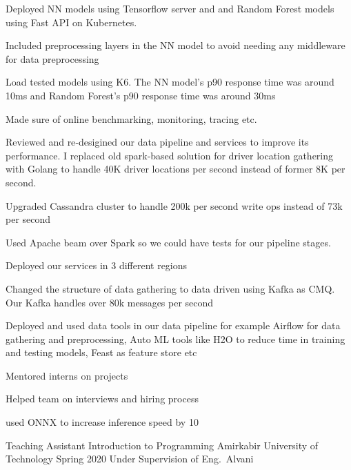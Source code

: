 \begin{cventries}
{\begin{cvitems}
        \item Deployed NN models using Tensorflow server and and Random Forest models using Fast API on Kubernetes. 
        \item Included preprocessing layers in the NN model to avoid needing any middleware for data preprocessing
        \item Load tested models using K6. The NN model's p90 response time was around 10ms and Random Forest's p90 response time was around 30ms
        \item Made sure of online benchmarking, monitoring, tracing etc.
        \item Reviewed and re‐desigined our data pipeline and services to improve its performance. I replaced old spark‐based solution for driver location gathering with Golang to handle 40K driver locations per second instead of former 8K per second.
        \item Upgraded Cassandra cluster to handle 200k per second write ops instead of 73k per second
        \item Used Apache beam over Spark so we could have tests for our pipeline stages.
        \item Deployed our services in 3 different regions 
        \item Changed the structure of data gathering to data driven using Kafka as CMQ. Our Kafka handles over 80k messages per second
        \item Deployed and used data tools in our data pipeline for example Airflow for data gathering and preprocessing, Auto ML tools like H2O to reduce time in training and testing models, Feast as feature store etc
        \item Mentored interns on projects
        \item Helped team on interviews and hiring process
        \item used ONNX to increase inference speed by 10%
      \end{cvitems}
    }

\end{cventries}


\begin{cventries}

  \cventry
    {Teaching Assistant} %
    {Introduction to Programming} %
    {Amirkabir University of Technology} %
    {Spring 2020} %
    {Under Supervision of Eng.~Alvani}


\end{cventries}
